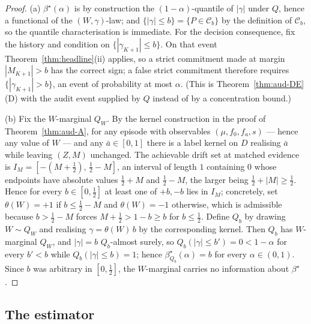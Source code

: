\begin{proof}
(a) $\beta^\star(\alpha)$ is by construction the $(1-\alpha)$-quantile of $|\gamma|$ under $Q$, hence
a functional of the $(W,\gamma)$-law; and $\{|\gamma|\le b\}=\{P\in\mathcal C_b\}$ by the definition
of $\mathcal C_b$, so the quantile characterisation is immediate. For the decision consequence, fix
the history and condition on $\{|\gamma_{K+1}|\le b\}$. On that event
Theorem~\ref{thm:headline}(ii) applies, so a strict commitment made at margin $|M_{K+1}|>b$ has the
correct sign; a false strict commitment therefore requires $\{|\gamma_{K+1}|>b\}$, an event of
probability at most $\alpha$. (This is Theorem~\ref{thm:aud-DE}(D) with the audit event supplied by
$Q$ instead of by a concentration bound.)

(b) Fix the $W$-marginal $Q_W$. By the kernel construction in the proof of
Theorem~\ref{thm:aud-A}, for any episode with observables $(\mu,f_0,f_a,s)$ --- hence any value of
$W$ --- and any $\bar a\in[0,1]$ there is a label kernel on $D$ realising $\bar a$ while leaving
$(Z,M)$ unchanged. The achievable drift set at matched evidence is
$I_M=[-(M+\tfrac12),\,\tfrac12-M]$, an interval of length $1$ containing $0$ whose endpoints have
absolute values $\tfrac12+M$ and $\tfrac12-M$, the larger being $\tfrac12+|M|\ge\tfrac12$. Hence for
every $b\in[0,\tfrac12]$ at least one of $+b,-b$ lies in $I_M$; concretely, set
$\theta(W)=+1$ if $b\le\tfrac12-M$ and $\theta(W)=-1$ otherwise, which is admissible because
$b>\tfrac12-M$ forces $M+\tfrac12>1-b\ge b$ for $b\le\tfrac12$. Define $Q_b$ by drawing
$W\sim Q_W$ and realising $\gamma=\theta(W)\,b$ by the corresponding kernel. Then $Q_b$ has
$W$-marginal $Q_W$, and $|\gamma|=b$ $Q_b$-almost surely, so
$Q_b(|\gamma|\le b')=0<1-\alpha$ for every $b'<b$ while $Q_b(|\gamma|\le b)=1$; hence
$\beta^\star_{Q_b}(\alpha)=b$ for every $\alpha\in(0,1)$. Since $b$ was arbitrary in
$[0,\tfrac12]$, the $W$-marginal carries no information about $\beta^\star$.
\end{proof}

\subsection{The estimator}

